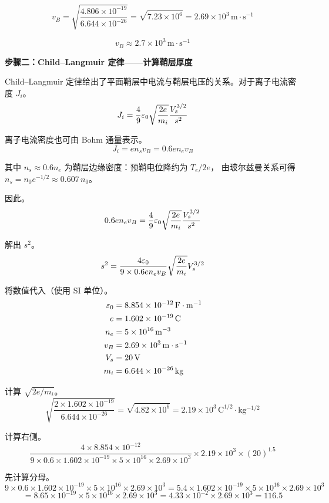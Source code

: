 \[
    v_B = \sqrt{\frac{4.806\times10^{-19}}{6.644\times10^{-26}}} = \sqrt{7.23\times10^6} = 2.69\times10^3\,\mathrm{m\cdot s^{-1}}
\]

\[
    \boxed{v_B \approx 2.7\times10^3\,\mathrm{m\cdot s^{-1}}}
\]

\textbf{步骤二：Child--Langmuir 定律——计算鞘层厚度}

Child--Langmuir 定律给出了平面鞘层中电流与鞘层电压的关系。对于离子电流密度 $J_i$。
\begin{equation}
    J_i = \frac{4}{9}\varepsilon_0 \sqrt{\frac{2e}{m_i}} \frac{V_s^{3/2}}{s^2}
\label{eq:ch11-child-langmuir}
\end{equation}

离子电流密度也可由 Bohm 通量表示。
\[
    J_i = e n_s v_B = 0.6 e n_e v_B
\]

其中 $n_s \approx 0.6 n_e$ 为鞘层边缘密度：预鞘电位降约为 $T_e/2e$，
由玻尔兹曼关系可得 $n_s = n_0 e^{-1/2} \approx 0.607\,n_0$。

因此。
\[
    0.6 e n_e v_B = \frac{4}{9}\varepsilon_0 \sqrt{\frac{2e}{m_i}} \frac{V_s^{3/2}}{s^2}
\]

解出 $s^2$。
\[
    s^2 = \frac{4\varepsilon_0}{9 \times 0.6 e n_e v_B} \sqrt{\frac{2e}{m_i}} V_s^{3/2}
\]

将数值代入（使用 SI 单位）。
\begin{align*}
    \varepsilon_0 &= 8.854\times10^{-12}\,\mathrm{F\cdot m^{-1}} \\
    e &= 1.602\times10^{-19}\,\mathrm{C} \\
    n_e &= 5\times10^{16}\,\mathrm{m^{-3}} \\
    v_B &= 2.69\times10^3\,\mathrm{m\cdot s^{-1}} \\
    V_s &= 20\,\mathrm{V} \\
    m_i &= 6.644\times10^{-26}\,\mathrm{kg}
\end{align*}

计算 $\sqrt{2e/m_i}$。
\[
    \sqrt{\frac{2\times1.602\times10^{-19}}{6.644\times10^{-26}}} = \sqrt{4.82\times10^6} = 2.19\times10^3\,\mathrm{C^{1/2}\cdot kg^{-1/2}}
\]

计算右侧。
\[
    \frac{4\times8.854\times10^{-12}}{9\times0.6\times1.602\times10^{-19}\times5\times10^{16}\times2.69\times10^3} \times 2.19\times10^3 \times (20)^{1.5}
\]

先计算分母。
\[
    9\times0.6\times1.602\times10^{-19}\times5\times10^{16}\times2.69\times10^3 = 5.4\times1.602\times10^{-19}\times5\times10^{16}\times2.69\times10^3
\]
\[
    = 8.65\times10^{-19}\times5\times10^{16}\times2.69\times10^3 = 4.33\times10^{-2}\times2.69\times10^3 = 116.5
\]

